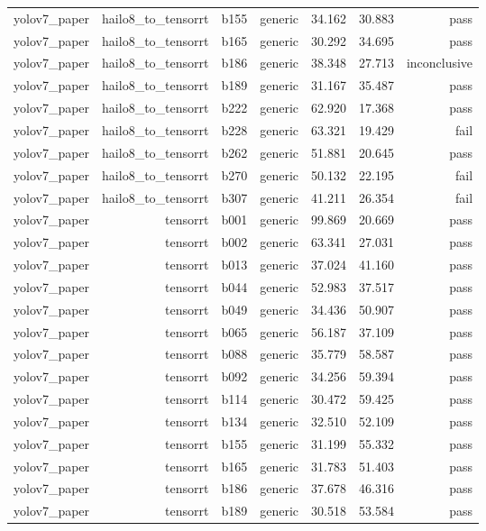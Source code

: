 \begin{table}[t]
\begin{tabular}{lrrrrrr}
yolov7\_paper & hailo8\_to\_tensorrt & b155 & generic & 34.162 & 30.883 & pass \\
yolov7\_paper & hailo8\_to\_tensorrt & b165 & generic & 30.292 & 34.695 & pass \\
yolov7\_paper & hailo8\_to\_tensorrt & b186 & generic & 38.348 & 27.713 & inconclusive \\
yolov7\_paper & hailo8\_to\_tensorrt & b189 & generic & 31.167 & 35.487 & pass \\
yolov7\_paper & hailo8\_to\_tensorrt & b222 & generic & 62.920 & 17.368 & pass \\
yolov7\_paper & hailo8\_to\_tensorrt & b228 & generic & 63.321 & 19.429 & fail \\
yolov7\_paper & hailo8\_to\_tensorrt & b262 & generic & 51.881 & 20.645 & pass \\
yolov7\_paper & hailo8\_to\_tensorrt & b270 & generic & 50.132 & 22.195 & fail \\
yolov7\_paper & hailo8\_to\_tensorrt & b307 & generic & 41.211 & 26.354 & fail \\
yolov7\_paper & tensorrt & b001 & generic & 99.869 & 20.669 & pass \\
yolov7\_paper & tensorrt & b002 & generic & 63.341 & 27.031 & pass \\
yolov7\_paper & tensorrt & b013 & generic & 37.024 & 41.160 & pass \\
yolov7\_paper & tensorrt & b044 & generic & 52.983 & 37.517 & pass \\
yolov7\_paper & tensorrt & b049 & generic & 34.436 & 50.907 & pass \\
yolov7\_paper & tensorrt & b065 & generic & 56.187 & 37.109 & pass \\
yolov7\_paper & tensorrt & b088 & generic & 35.779 & 58.587 & pass \\
yolov7\_paper & tensorrt & b092 & generic & 34.256 & 59.394 & pass \\
yolov7\_paper & tensorrt & b114 & generic & 30.472 & 59.425 & pass \\
yolov7\_paper & tensorrt & b134 & generic & 32.510 & 52.109 & pass \\
yolov7\_paper & tensorrt & b155 & generic & 31.199 & 55.332 & pass \\
yolov7\_paper & tensorrt & b165 & generic & 31.783 & 51.403 & pass \\
yolov7\_paper & tensorrt & b186 & generic & 37.678 & 46.316 & pass \\
yolov7\_paper & tensorrt & b189 & generic & 30.518 & 53.584 & pass \\

\end{tabular}
\end{table}
